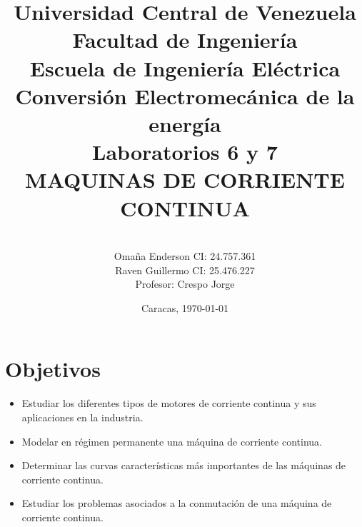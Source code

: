 \documentclass[11pt,letterpaper]{article}     %
\author{\\Omaña Enderson CI: 24.757.361\\Raven Guillermo CI: 25.476.227\\Profesor: Crespo Jorge \vspace*{1in}}
\title{Universidad Central de Venezuela\\{ Facultad de Ingeniería\\Escuela de Ingeniería Eléctrica\\ Conversión Electromecánica de la energía\\\vspace*{1.5in} }Laboratorios 6 y 7\\MAQUINAS DE CORRIENTE CONTINUA\vspace*{1.35in}}
\date{Caracas, \today}
\begin{document}
\maketitle							%
\newpage
\tableofcontents
\newpage
\section{Objetivos}
\begin{itemize}
	\item Estudiar los diferentes tipos de motores de corriente continua y sus
    aplicaciones en la industria.
	\item Modelar en régimen permanente una máquina de corriente continua.
	\item Determinar las curvas características más importantes de las máquinas de
    corriente continua.
    \item Estudiar los problemas asociados a la conmutación de una máquina de
    corriente continua.
\end{itemize}
\end{document}
